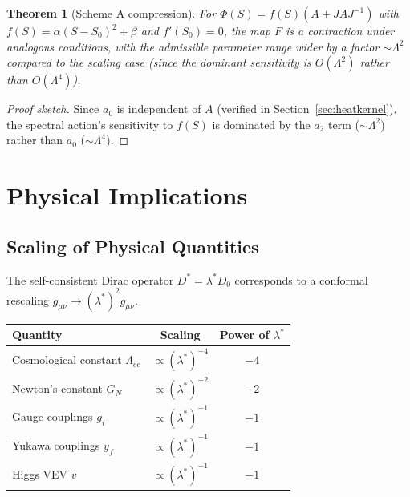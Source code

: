 \documentclass[11pt,a4paper]{article}
\newtheorem{theorem}{Theorem}[section]
\theoremstyle{remark}
\newcommand{\Lcc}{\Lambda_{\mathrm{cc}}}
\newcommand{\GN}{G_N}
\begin{document}
\begin{theorem}[Scheme A compression]
For $\Phi(S) = f(S)(A + JAJ^{-1})$ with $f(S) = \alpha(S-S_0)^2 + \beta$ and $f'(S_0) = 0$, the map $F$ is a contraction under analogous conditions, with the admissible parameter range wider by a factor $\sim \Lambda^2$ compared to the scaling case (since the dominant sensitivity is $O(\Lambda^2)$ rather than $O(\Lambda^4)$).
\end{theorem}

\begin{proof}[Proof sketch]
Since $a_0$ is independent of $A$ (verified in Section~\ref{sec:heatkernel}), the spectral action's sensitivity to $f(S)$ is dominated by the $a_2$ term ($\sim \Lambda^2$) rather than $a_0$ ($\sim \Lambda^4$).
\end{proof}

\section{Physical Implications}

\subsection{Scaling of Physical Quantities}

The self-consistent Dirac operator $D^* = \lambda^* D_0$ corresponds to a conformal rescaling $g_{\mu\nu} \to (\lambda^*)^2 g_{\mu\nu}$.

\begin{table}[h]
\centering
\begin{tabular}{lcc}
\toprule
Quantity & Scaling & Power of $\lambda^*$ \\
\midrule
Cosmological constant $\Lcc$ & $\propto (\lambda^*)^{-4}$ & $-4$ \\
Newton's constant $\GN$ & $\propto (\lambda^*)^{-2}$ & $-2$ \\
Gauge couplings $g_i$ & $\propto (\lambda^*)^{-1}$ & $-1$ \\
Yukawa couplings $y_f$ & $\propto (\lambda^*)^{-1}$ & $-1$ \\
Higgs VEV $v$ & $\propto (\lambda^*)^{-1}$ & $-1$ \\
\bottomrule
\end{tabular}
\end{table}
\end{document}

